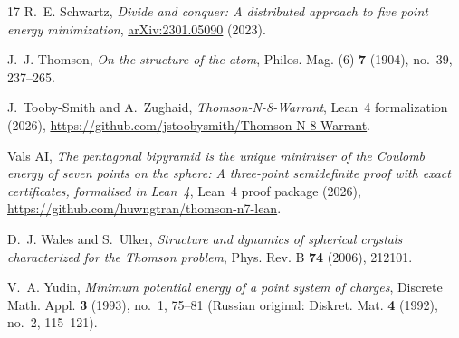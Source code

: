 \documentclass[11pt,reqno]{amsart}
\renewcommand{\_}{\origunderscore\allowbreak}
\theoremstyle{definition}
\begin{document}
\begin{thebibliography}{17}
R.~E. Schwartz,
\emph{Divide and conquer: A distributed approach to five point energy minimization},
\href{https://arxiv.org/abs/2301.05090}{arXiv:2301.05090} (2023).

J.~J. Thomson,
\emph{On the structure of the atom},
Philos. Mag. (6) \textbf{7} (1904), no.~39, 237--265.

J.~Tooby-Smith and A.~Zughaid,
\emph{Thomson-N-8-Warrant},
Lean~4 formalization (2026),
\url{https://github.com/jstoobysmith/Thomson-N-8-Warrant}.

Vals AI,
\emph{The pentagonal bipyramid is the unique minimiser of the Coulomb energy of seven points on the sphere: A three-point semidefinite proof with exact certificates, formalised in Lean~4},
Lean~4 proof package (2026),
\url{https://github.com/huwngtran/thomson-n7-lean}.

D.~J. Wales and S.~Ulker,
\emph{Structure and dynamics of spherical crystals characterized for the Thomson problem},
Phys. Rev. B \textbf{74} (2006), 212101.

V.~A. Yudin,
\emph{Minimum potential energy of a point system of charges},
Discrete Math. Appl. \textbf{3} (1993), no.~1, 75--81 (Russian original: Diskret. Mat. \textbf{4} (1992), no.~2, 115--121).

\end{thebibliography}
\end{document}
